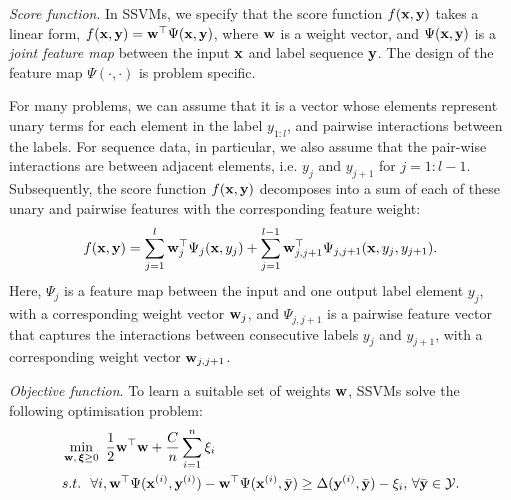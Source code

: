 \emph{Score function}. In SSVMs, we specify that the score function $f(\mathbf{x}, \mathbf{y})$ takes a linear form, \ie 
$f(\mathbf{x}, \mathbf{y}) = \mathbf{w}^\top \Psi(\mathbf{x}, \mathbf{y})$,
where $\mathbf{w}$ is a weight vector, and $\Psi(\mathbf{x}, \mathbf{y})$ is a \emph{joint feature map}
between the input $\mathbf{x}$ and label sequence $\mathbf{y}$.
The design of the feature map $\Psi(\cdot,\cdot)$ is problem specific.

For many problems, we can assume that it is a vector whose elements represent unary
terms for each element in the label $y_{1:l}$, and pairwise interactions between the labels.
For sequence data, in particular, we also assume that the pair-wise interactions are between
adjacent elements, i.e. $y_j$ and $y_{j+1}$ for $j=1:l-1$.
Subsequently, the score function $f(\mathbf{x},\mathbf{y})$ decomposes into a sum of
each of these unary and pairwise features with the corresponding feature weight:
\begin{equation}
\label{eq:jointfeature}
f(\mathbf{x}, \mathbf{y}) =  \sum_{j=1}^l \mathbf{w}_j^\top \Psi_j(\mathbf{x}, y_j) + \sum_{j=1}^{l-1} \mathbf{w}_{j,j+1}^\top \Psi_{j,j+1}(\mathbf{x}, y_{j}, y_{j+1}).
\end{equation}
Here, $\Psi_j$ is a feature map between the input and one output label element $y_j$, with a corresponding weight vector $\mathbf{w}_j$,
and $\Psi_{j,j+1}$ is a pairwise feature vector that captures the interactions between consecutive labels $y_j$ and $y_{j+1}$,
with a corresponding weight vector $\mathbf{w}_{j,j+1}$.

\emph{Objective function}.
To learn a suitable set of weights $\mathbf{w}$, SSVMs solve the following optimisation problem:
\begin{equation}
\label{eq:nslack}
\begin{aligned}
&\min_{\mathbf{w}, \, \bm{\xi} \ge 0} ~\frac{1}{2} \mathbf{w}^\top \mathbf{w} + \frac{C}{n} \sum_{i=1}^n \xi_i \\
&s.t.~~  \forall i, 
  \mathbf{w}^\top \Psi(\mathbf{x}^{(i)}, \mathbf{y}^{(i)}) - \mathbf{w}^\top \Psi(\mathbf{x}^{(i)}, \bar{\mathbf{y}}) \ge
  \Delta(\mathbf{y}^{(i)}, \bar{\mathbf{y}}) - \xi_i, \, \forall \bar{\mathbf{y}} \in \mathcal{Y}.
\end{aligned}
\end{equation}


